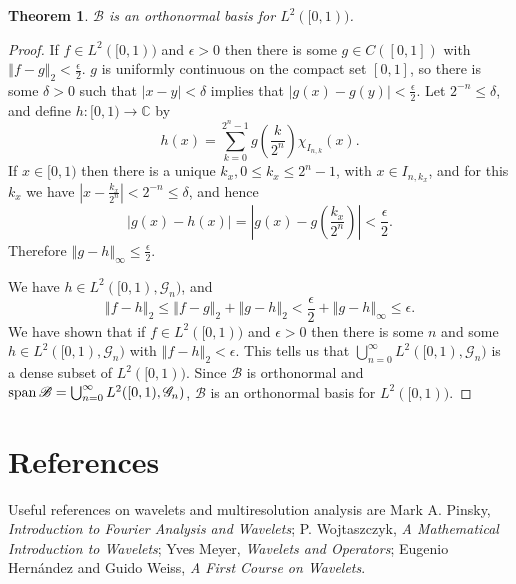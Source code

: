 \documentclass{article}
\newcommand{\Span}{\ensuremath\mathrm{span}\,}
\newcommand{\norm}[1]{\left\Vert #1 \right\Vert}
\newtheorem{theorem}{Theorem}
\theoremstyle{definition}
\begin{document}
\begin{theorem}
$\mathscr{B}$ is an orthonormal basis for $L^2([0,1))$.
\end{theorem}
\begin{proof}
If $f \in L^2([0,1))$ and $\epsilon>0$ then there is some $g \in C([0,1])$ with
$\norm{f-g}_2<\frac{\epsilon}{2}$. $g$ is uniformly continuous on the compact set $[0,1]$, so there is some $\delta>0$ such that
$|x-y|<\delta$ implies that $|g(x)-g(y)|<\frac{\epsilon}{2}$. Let $2^{-n} \leq \delta$, and define $h:[0,1) \to \mathbb{C}$ by
\[
h(x)=\sum_{k=0}^{2^n-1} g\left(\frac{k}{2^n}\right) \chi_{I_{n,k}}(x).
\]
If $x \in [0,1)$ then there is a unique $k_x, 0 \leq k_x \leq 2^n-1$, with $x \in I_{n,k_x}$, and for this $k_x$ we have $\left| x - \frac{k_x}{2^n} \right| < 2^{-n} \leq
\delta$, and hence 
\[
|g(x)-h(x)| = \left| g(x)-g\left(\frac{k_x}{2^n}\right) \right|<\frac{\epsilon}{2}.
\]
Therefore $\norm{g-h}_\infty \leq \frac{\epsilon}{2}$.

We have $h \in L^2([0,1),\mathscr{G}_n)$, and 
\[
\norm{f-h}_2 \leq  \norm{f-g}_2 + \norm{g-h}_2 <\frac{\epsilon}{2} + \norm{g-h}_\infty \leq \epsilon.
\]
We have shown that if $f \in L^2([0,1))$ and $\epsilon>0$ then there is some $n$ and some $h \in L^2([0,1),\mathscr{G}_n)$ with
$\norm{f-h}_2 < \epsilon$. This tells us that $\bigcup_{n=0}^\infty L^2([0,1),\mathscr{G}_n)$ is a dense subset of $L^2([0,1))$.
Since $\mathscr{B}$ is orthonormal 
and $\Span \mathscr{B} = \bigcup_{n=0}^\infty L^2([0,1),\mathscr{G}_n)$, $\mathscr{B}$ is an orthonormal basis for $L^2([0,1))$. 
\end{proof}






\section{References}
Useful references on wavelets and multiresolution analysis are Mark A. Pinsky, {\em Introduction to Fourier Analysis and Wavelets}; P. Wojtaszczyk, {\em A Mathematical Introduction to Wavelets}; 
Yves Meyer, {\em Wavelets and Operators};  Eugenio Hern\'andez and Guido Weiss, {\em A First Course on Wavelets}.
 
\end{document}
